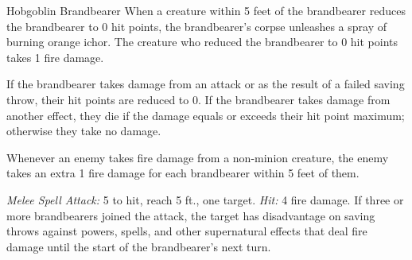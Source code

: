 \documentclass[10pt,a4paper,twoside,bg=print,twocolumn,openany,nodeprecatedcode]{dndbook}
\begin{document}
\begin{DndMonster}[float=t]{Hobgoblin Brandbearer}
\DndMonsterBasics[
armor-class = {13 (\textit{hide armor})},
hit-points = {\DndDice{12}},
speed = {30 ft.}
]
\DndMonsterAbilityScores[
 str = 14,
 dex = 12,
 con = 12,
 int = 10,
 wis = 11,
 cha = 15
]
\DndMonsterDetails[
damage-immunities = {fire},
senses = {darkvision 60 ft., passive perception 10},
languages = {Common, Goblin, Infernal},
challenge = 5,
]
When a creature within 5 feet of the brandbearer reduces the brandbearer to 0 hit points, the brandbearer's corpse unleashes a spray of burning orange ichor. The creature who reduced the brandbearer to 0 hit points takes 1 fire damage.

If the brandbearer takes damage from an attack or as the result of a failed saving throw, their hit points are reduced to 0. If the brandbearer takes damage from another effect, they die if the damage equals or exceeds their hit point maximum; otherwise they take no damage.

Whenever an enemy takes fire damage from a non-minion creature, the enemy takes an extra 1 fire damage for each brandbearer within 5 feet of them.

\textsl{Melee Spell Attack:} 5 to hit, reach 5 ft., one target. \textsl{Hit:} 4 fire damage. If three or more brandbearers joined the attack, the target has disadvantage on saving throws against powers, spells, and other supernatural effects that deal fire damage until the start of the brandbearer's next turn.

\end{DndMonster}


\clearpage
\end{document}
